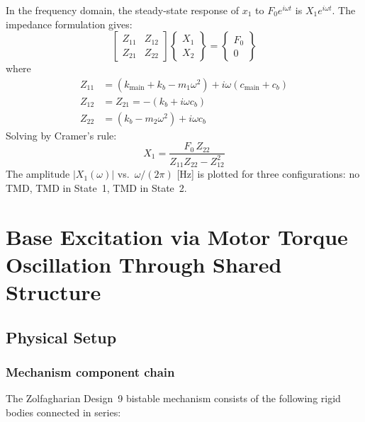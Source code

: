 \documentclass[11pt,letterpaper]{article}
\begin{document}
In the frequency domain, the steady-state response of $x_1$ to
$F_0 e^{i\omega t}$ is $X_1 e^{i\omega t}$. The impedance formulation gives:
\begin{equation}
  \begin{bmatrix} Z_{11} & Z_{12} \\ Z_{21} & Z_{22} \end{bmatrix}
  \begin{Bmatrix} X_1 \\ X_2 \end{Bmatrix} =
  \begin{Bmatrix} F_0 \\ 0 \end{Bmatrix}
  \label{eq:impedance}
\end{equation}
where
\begin{align}
  Z_{11} &= (k_{\mathrm{main}} + k_b - m_1\omega^2) + i\omega(c_{\mathrm{main}} + c_b) \\
  Z_{12} &= Z_{21} = -(k_b + i\omega c_b) \\
  Z_{22} &= (k_b - m_2\omega^2) + i\omega c_b
\end{align}
Solving by Cramer's rule:
\begin{equation}
  X_1 = \frac{F_0\,Z_{22}}{Z_{11}Z_{22} - Z_{12}^2}
  \label{eq:X1}
\end{equation}
The amplitude $|X_1(\omega)|$ vs.\ $\omega/(2\pi)$ [Hz] is plotted for three
configurations: no TMD, TMD in State~1, TMD in State~2.

\section{Base Excitation via Motor Torque Oscillation Through Shared Structure}
\label{sec:baseexcit}

\subsection{Physical Setup}
\label{ssec:setup_base}

\subsubsection{Mechanism component chain}

The Zolfagharian Design~9 bistable mechanism consists of the following rigid
bodies connected in series:
\end{document}
